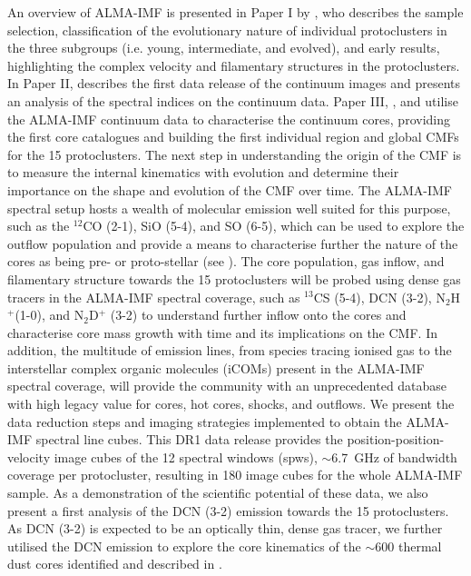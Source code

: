 \documentclass[longauth]{aa} %
\newcommand{\nthp}{\mbox{N$_2$H$^+$}}
\begin{document}
An overview of ALMA-IMF is presented in Paper I by \cite{Motte2022}, who describes the sample selection, classification of the evolutionary nature of individual protoclusters in the three subgroups (i.e. young, intermediate, and evolved), and early results, highlighting the complex velocity and filamentary structures in the protoclusters. In Paper II, \cite{Ginsburg2022} describes the first data release of the continuum images and presents an analysis of the spectral indices on the continuum data. Paper III, \cite{Pouteau22}, and \cite{louvet22} utilise the ALMA-IMF continuum data to characterise the continuum cores, providing the first core catalogues and building the first individual region and global CMFs for the 15 protoclusters. The next step in understanding the origin of the CMF is to measure the internal kinematics with evolution and determine their importance on the shape and evolution of the CMF over time. The ALMA-IMF spectral setup hosts a wealth of molecular emission well suited for this purpose, such as the $^{12}$CO (2-1), SiO (5-4), and SO (6-5), which can be used to explore the outflow population and provide a means to characterise further the nature of the cores as being pre- or proto-stellar (see \citealt{Nony2023}). The core population, gas inflow, and filamentary structure towards the 15 protoclusters will be probed using dense gas tracers in the ALMA-IMF spectral coverage, such as $^{13}$CS (5-4), DCN (3-2), \nthp (1-0), and N$_2$D$^+$ (3-2) to understand further inflow onto the cores and characterise core mass growth with time and its implications on the CMF. In addition, the multitude of emission lines, from species tracing ionised gas to the interstellar complex organic molecules (iCOMs) present in the ALMA-IMF spectral coverage, will provide the community with an unprecedented database with high legacy value for cores, hot cores, shocks, and outflows.
We present the data reduction steps and imaging strategies implemented to obtain the ALMA-IMF spectral line cubes. This DR1 data release provides the position-position-velocity image cubes of the 12 spectral windows (spws), $\sim$6.7~GHz of bandwidth coverage per protocluster, resulting in 180 image cubes for the whole ALMA-IMF sample. 
As a demonstration of the scientific potential of these data, we also present
a first analysis of the DCN (3-2) emission towards the 15 protoclusters. As DCN (3-2) is expected to be an optically thin, dense gas tracer, we further utilised the DCN emission to explore the core kinematics of the $\sim$600 thermal dust cores identified and described in \citet{louvet22}. 
\end{document}
